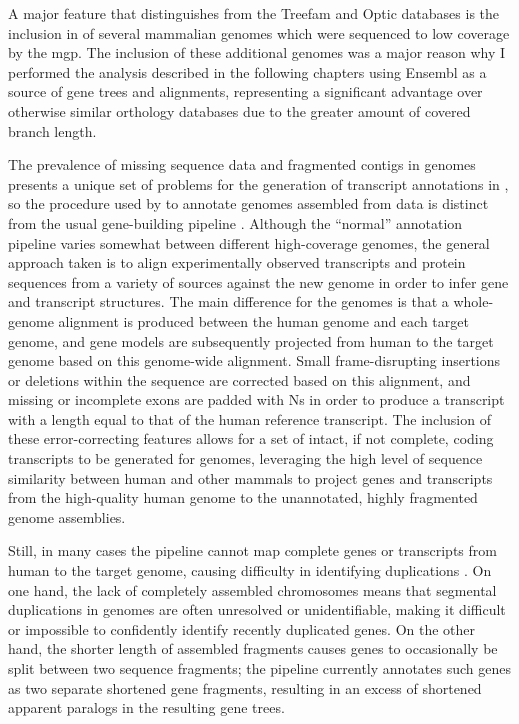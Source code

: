 A major feature that distinguishes \cmp from the Treefam and Optic
databases is the inclusion in \cmp of several mammalian genomes which
were sequenced to low coverage by the \ac{mgp}. The inclusion of these
additional genomes was a major reason why I performed the analysis
described in the following chapters using Ensembl as a source of gene
trees and alignments, representing a significant advantage over
otherwise similar orthology databases due to the greater amount of
covered branch length.

The prevalence of missing sequence data and fragmented contigs in \lcv
genomes presents a unique set of problems for the generation of
transcript annotations in \ens, so the procedure used by \cmp to
annotate genomes assembled from \lcv data is distinct from the usual
gene-building pipeline \citep{Hubbard2007}. Although the ``normal''
annotation pipeline varies somewhat between different high-coverage
genomes, the general approach taken is to align experimentally
observed transcripts and protein sequences from a variety of sources
against the new genome in order to infer gene and transcript
structures. The main difference for the \lcv genomes is that a
whole-genome alignment is produced between the human genome and each
\lcv target genome, and gene models are subsequently projected from
human to the target genome based on this genome-wide alignment. Small
frame-disrupting insertions or deletions within the \lcv sequence are
corrected based on this alignment, and missing or incomplete exons are
padded with Ns in order to produce a transcript with a length equal to
that of the human reference transcript. The inclusion of these
error-correcting features allows for a set of intact, if not complete,
coding transcripts to be generated for \lcv genomes, leveraging the
high level of sequence similarity between human and other \euth
mammals to project genes and transcripts from the high-quality human
genome to the unannotated, highly fragmented \lcv genome assemblies.

Still, in many cases the \ens pipeline cannot map complete genes or
transcripts from human to the target genome, causing difficulty in
identifying duplications \citep{Hubbard2007}. On one hand, the lack of
completely assembled chromosomes means that segmental duplications in
\lcv genomes are often unresolved or unidentifiable, making it
difficult or impossible to confidently identify recently duplicated
genes. On the other hand, the shorter length of assembled fragments
causes genes to occasionally be split between two sequence fragments;
the \ens pipeline currently annotates such genes as two separate
shortened gene fragments, resulting in an excess of shortened apparent
paralogs in the resulting gene trees.

